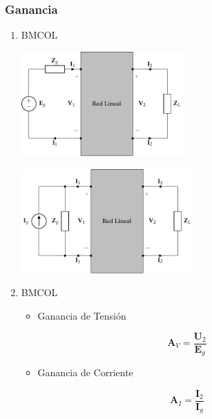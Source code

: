 \subsubsection{Ganancia}
\label{sec:orge1f4b88}

\begin{enumerate}
\item \hfill{}\textsc{BMCOL}
\label{sec:org1a393ee}

\includegraphics[height=4cm]{../figs/cuadripolo_cargado_fuente_tension.pdf}


\includegraphics[height=4cm]{../figs/cuadripolo_cargado_fuente_corriente.pdf}



\item \hfill{}\textsc{BMCOL}
\label{sec:org77ac402}
\begin{itemize}
\item Ganancia de Tensión
\end{itemize}
\[
\mathbf{A}_V = \frac{\mathbf{U}_2}{\mathbf{E}_g}
\]
\begin{itemize}
\item Ganancia de Corriente
\end{itemize}
\[
\mathbf{A}_I = \frac{\mathbf{I}_2}{\mathbf{I}_g}
\]
\end{enumerate}

